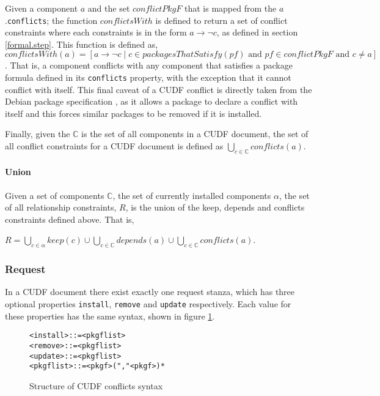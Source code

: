 Given a component $a$ and the set $conflictPkgF$ that is mapped from the $a$.\verb+conflicts+;
the function $conflictsWith$ is defined to return a set of conflict constraints where each constraints is in the form $a \rightarrow \neg c$, as defined in section \ref{formal.step}.
This function is defined as, 
$conflictsWith(a) = [a \rightarrow \neg c \mid c \in packagesThatSatisfy(pf) \mbox{ and } pf \in conflictPkgF \mbox { and } c \not = a]$.
That is, a component conflicts with any component that satisfies a package formula defined in its \verb+conflicts+ property,
with the exception that it cannot conflict with itself.
This final caveat of a CUDF conflict is directly taken from the Debian package specification \citep{Barth2005}, 
as it allows a package to declare a conflict with itself and this forces similar packages to be removed if it is installed.  

Finally, given the $\mathbb{C}$ is the set of all components in a CUDF document,
the set of all conflict constraints for a CUDF document is defined as $\bigcup \limits_{c\in \mathbb{C}} conflicts(a)$.

\paragraph{Union}
Given a set of components $\mathbb{C}$, the set of currently installed components $\alpha$, 
the set of all relationship constraints, $R$, is the union of the keep, depends and conflicts constraints defined above.
That is, 
\begin{defs}
$R = \bigcup \limits_{c \in \alpha} keep(c) \cup \bigcup \limits_{c\in \mathbb{C}} depends(a) \cup \bigcup \limits_{c\in \mathbb{C}} conflicts(a)$.
\end{defs}

\subsubsection{Request}
\label{formal.cudf.request}
In a CUDF document there exist exactly one request stanza, which has three optional properties \verb+install+, \verb+remove+ and \verb+update+ respectively.
Each value for these properties has the same syntax, shown in figure \ref{formal.requestssyntax}.

\begin{figure}[htp] 
\begin{center}
\begin{alltt}
<install> ::= <pkgflist>
<remove> ::= <pkgflist>
<update> ::= <pkgflist>
<pkgflist> ::= <pkgf> ("," <pkgf>)*
\end{alltt}
  \caption[CUDF Package conflicts syntax]{Structure of CUDF conflicts syntax}
  \label{formal.requestssyntax}
\end{center}
\end{figure}

